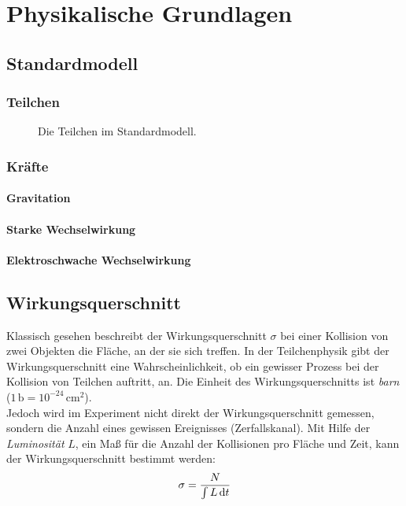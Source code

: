 \section{Physikalische Grundlagen}
\subsection{Standardmodell}
\subsubsection{Teilchen}

\begin{figure}[H]
        \centering
        \def\svgwidth{0.55\textwidth}
       
        \caption{Die Teilchen im Standardmodell.}
        \label{img:standardmodel}
\end{figure}

\subsubsection{Kräfte}
\paragraph{Gravitation}
\paragraph{Starke Wechselwirkung}
\paragraph{Elektroschwache Wechselwirkung}
\subsection{Wirkungsquerschnitt}
Klassisch gesehen beschreibt der Wirkungsquerschnitt $\sigma$ bei einer Kollision von zwei Objekten die Fläche, an der sie sich treffen. 
In der Teilchenphysik gibt der Wirkungsquerschnitt eine Wahrscheinlichkeit, ob ein gewisser Prozess bei der Kollision von Teilchen auftritt, an.
Die Einheit des Wirkungsquerschnitts ist \emph{barn} ($1\,\text{b} = 10^{-24}\,\text{cm}^2$). \\
Jedoch wird im Experiment nicht direkt der Wirkungsquerschnitt gemessen, sondern die Anzahl eines gewissen Ereignisses (Zerfallskanal). Mit Hilfe 
der \emph{Luminosität} $L$, ein Maß für die Anzahl der Kollisionen pro Fläche und Zeit, kann der Wirkungsquerschnitt bestimmt werden:
\begin{equation}
    \sigma = \frac{N}{\int L \, \mathrm{d} t}
\end{equation}
